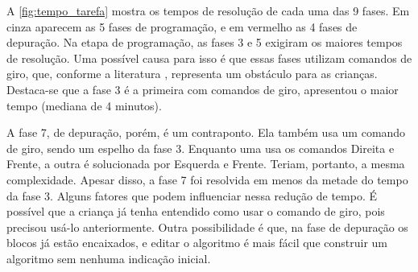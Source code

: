 A \autoref{fig:tempo_tarefa} mostra os tempos de resolução de cada uma das 9 fases. Em cinza aparecem as 5 fases de programação, e em vermelho as 4 fases de depuração. Na etapa de programação, as fases 3 e 5 exigiram os maiores tempos de resolução. Uma possível causa para isso é que essas fases utilizam comandos de giro, que, conforme a literatura \cite{piaget_development_1964},  representa um obstáculo para as crianças. Destaca-se que a fase 3 é a primeira com comandos de giro, apresentou o maior tempo (mediana de 4 minutos).

A fase 7, de depuração, porém, é um contraponto. Ela também usa um comando de giro, sendo um espelho da fase 3. Enquanto uma usa os comandos Direita e Frente, a outra é solucionada por Esquerda e Frente. Teriam, portanto, a mesma complexidade. Apesar disso, a fase 7 foi resolvida em menos da metade do tempo da fase 3. Alguns fatores que podem influenciar nessa redução de tempo. É possível que a criança já tenha entendido como usar o comando de giro, pois precisou usá-lo anteriormente. Outra possibilidade é que, na fase de depuração os blocos já estão encaixados, e editar o algoritmo é mais fácil que construir um algoritmo sem nenhuma indicação inicial. 







